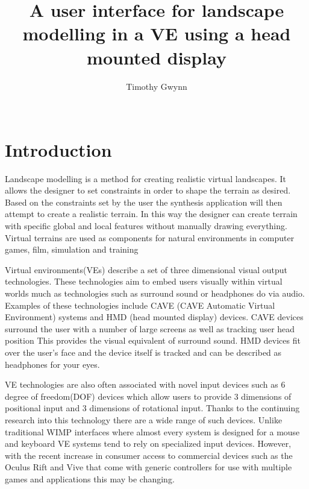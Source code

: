 \documentclass{sig-alternate-05-2015}
\begin{document}
\title{A user interface for landscape modelling in a VE using a head mounted display}

\author{
\alignauthor
Timothy Gwynn\\
       \\
}
\maketitle
\begin{CCSXML}

\end{CCSXML}



\printccsdesc
{}
\begin{abstract}
	
\end{abstract}
\section{Introduction}
Landscape modelling is a method for creating realistic virtual landscapes. It allows the designer to set constraints in order to shape the terrain as desired. Based on the constraints set by the user the synthesis application will then attempt to create a realistic terrain. In this way the designer can create terrain with specific global and local features without manually drawing everything. Virtual terrains are used as components for natural environments in computer games, film, simulation and training\cite{Gain2015}

Virtual environments(VEs) describe a set of three dimensional visual output technologies. These technologies aim to embed users visually within virtual worlds much as technologies such as surround sound or headphones do via audio. Examples of these technologies include CAVE (CAVE Automatic Virtual
Environment)  systems and HMD (head mounted display) devices.
CAVE devices surround the user with a number of large screens as well as tracking user head position\cite{Cruz-Neira1993} This provides the visual equivalent of surround sound. HMD devices fit over the user's face and the device itself is tracked and can be described as headphones for your eyes.\cite{alger2015visual}

VE technologies are also often associated with novel input devices such as 6 degree of freedom(DOF) devices which allow users to provide 3 dimensions of positional input and 3 dimensions of rotational input. Thanks to the continuing research into this technology there are a wide range of such devices. Unlike traditional WIMP interfaces where almost every system is designed for a mouse and keyboard VE systems tend to rely on specialized input devices\cite{Hand1997,Bowman2001}. However, with the recent increase in consumer access to commercial devices such as the Oculus Rift and Vive that come with generic controllers for use with multiple games and applications this may be changing.
\end{document}
